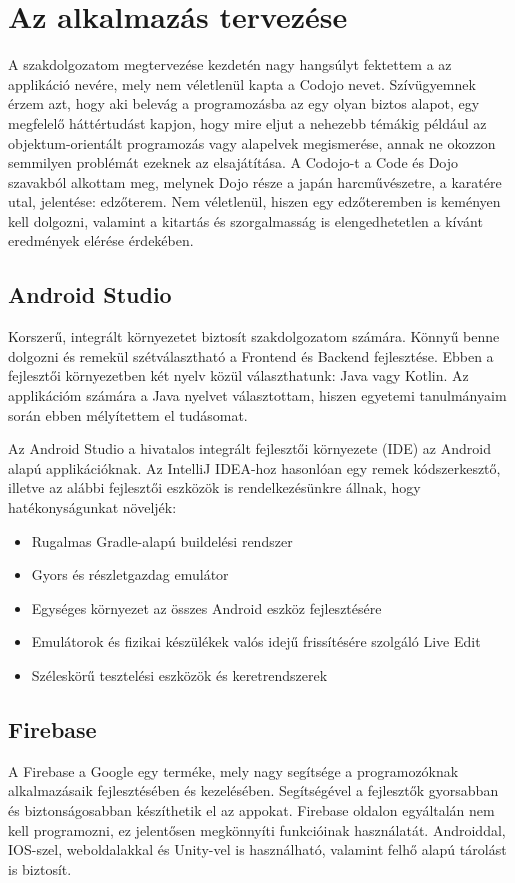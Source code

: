 \documentclass{thesis-ekf}
\begin{document}
	\chapter{Az alkalmazás tervezése}
	A szakdolgozatom megtervezése kezdetén nagy hangsúlyt fektettem a az applikáció nevére, mely nem véletlenül kapta a Codojo nevet. Szívügyemnek érzem azt, hogy aki belevág a programozásba az egy olyan biztos alapot, egy megfelelő háttértudást kapjon, hogy mire eljut a nehezebb témákig például az objektum-orientált programozás vagy alapelvek megismerése, annak ne okozzon semmilyen problémát ezeknek az elsajátítása. A Codojo-t a Code és Dojo szavakból alkottam meg, melynek Dojo része a japán harcművészetre, a karatére utal, jelentése: edzőterem. Nem véletlenül, hiszen egy edzőteremben is keményen kell dolgozni, valamint a kitartás és szorgalmasság is elengedhetetlen a kívánt eredmények elérése érdekében.
	\section{Android Studio}
	Korszerű, integrált környezetet biztosít szakdolgozatom számára. Könnyű benne dolgozni és remekül szétválasztható a Frontend és Backend fejlesztése. Ebben a fejlesztői környezetben két nyelv közül választhatunk: Java vagy Kotlin. Az applikációm számára a Java nyelvet választottam, hiszen egyetemi tanulmányaim során ebben mélyítettem el tudásomat.
	
	Az Android Studio a hivatalos integrált fejlesztői környezete (IDE) az Android alapú applikációknak. Az IntelliJ IDEA-hoz hasonlóan egy remek kódszerkesztő, illetve az alábbi fejlesztői eszközök is rendelkezésünkre állnak, hogy hatékonyságunkat növeljék:
	\begin{itemize}
		\item Rugalmas Gradle-alapú buildelési rendszer
		\item Gyors és részletgazdag emulátor
		\item Egységes környezet az összes Android eszköz fejlesztésére
		\item Emulátorok és fizikai készülékek valós idejű frissítésére szolgáló Live Edit
		\item Széleskörű tesztelési eszközök és keretrendszerek \cite{android_studio}
	\end{itemize}
	\section{Firebase}
	A Firebase a Google egy terméke, mely nagy segítsége a programozóknak alkalmazásaik fejlesztésében és kezelésében. Segítségével a fejlesztők gyorsabban és biztonságosabban készíthetik el az appokat. Firebase oldalon egyáltalán nem kell programozni, ez jelentősen megkönnyíti funkcióinak használatát. Androiddal, IOS-szel, weboldalakkal és Unity-vel is használható, valamint felhő alapú tárolást is biztosít. 
	
\end{document}
